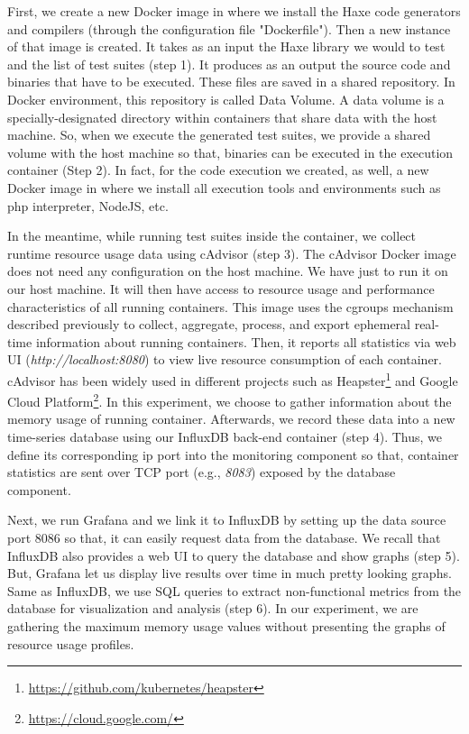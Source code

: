First, we create a new Docker image in where we install the Haxe code generators and compilers (through the configuration file "Dockerfile"). Then a new instance of that image is created. It takes as an input the Haxe library we would to test and the list of test suites (step 1). It produces as an output the source code and binaries that have to be executed. These files are saved in a shared repository.
In Docker environment, this repository is called Data Volume. A data volume is a specially-designated directory within containers that share data with the host machine. So, when
we execute the generated test suites, we provide a shared volume with
the host machine so that, binaries can be executed in the execution container (Step 2). In fact, for the code execution we created, as well, a new Docker image in where we install all execution tools and environments such as php interpreter, NodeJS, etc. 

In the meantime, while running test suites inside the container, we collect runtime resource usage data using cAdvisor (step 3). The cAdvisor Docker image does not need any configuration on the host machine. We have just to run it on our host machine. It will then have access to resource usage and performance characteristics of all running containers. This image uses the cgroups mechanism described previously to collect, aggregate, process, and export ephemeral real-time information about running containers. Then, it reports all statistics via web UI (\textit{http://localhost:8080}) to view live resource consumption of each container. cAdvisor has been widely used in different projects such as Heapster\footnote{\url{https://github.com/kubernetes/heapster}} and Google Cloud Platform\footnote{\url{https://cloud.google.com/}}. In this experiment, we choose to gather information about the memory usage of running container.
Afterwards, we record these data into a new time-series database using our InfluxDB back-end container (step 4). Thus, we define its corresponding ip port into the monitoring component so that, container statistics are sent over TCP port (e.g., \textit{8083}) exposed by the database component. 

Next, we run Grafana and we link it to InfluxDB by setting up the data source port 8086 so that, it can easily request data from the database. We recall that InfluxDB also provides a web UI to query the database and show graphs (step 5). But, Grafana let us display live results over time in much pretty looking graphs. Same as InfluxDB, we use SQL queries to extract non-functional metrics from the database for visualization and analysis (step 6). In our experiment, we are gathering the maximum memory usage values without presenting the graphs of resource usage profiles.

